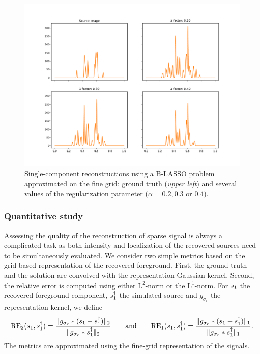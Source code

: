         \begin{figure}[t]
            \centering
            \includegraphics[width=\linewidth, trim=0 2cm 0 2.2cm, clip]{figures/simple_reco/blasso_merged.pdf}
            \caption{Single-component reconstructions using a B-LASSO problem approximated on the fine grid: ground truth (\textit{upper left}) and several values of the regularization parameter ($\alpha=0.2, 0.3$ or $0.4$). }
            \label{fig:simple:blasso-conv}
        \end{figure}
        
        \subsubsection{Quantitative study}

        Assessing the quality of the reconstruction of sparse signal is always a complicated task as both intensity and localization of the recovered sources need to be simultaneously evaluated. We consider two simple metrics based on the grid-based representation of the recovered foreground. First, the ground truth and the solution are convolved with the representation Gaussian kernel. Second, the relative error is computed using either $\mathrm{L}^2$-norm or the $\mathrm{L}^1$-norm. For $s_1$ the recovered foreground component, $s_1^\dagger$ the simulated source and $g_{\sigma_r}$ the representation kernel, we define
        $$
        \mathrm{RE}_2(s_1, s_1^\dagger) = \frac{\lVert g_{\sigma_r} * (s_1 - s_1^\dagger) \rVert_2 }{ \lVert g_{\sigma_r} * s_1^\dagger \rVert_2} \qquad\text{and}\qquad
        \mathrm{RE}_1(s_1, s_1^\dagger) = \frac{\lVert g_{\sigma_r} * (s_1 - s_1^\dagger) \rVert_1}{\lVert g_{\sigma_r} *s_1^\dagger \rVert_1}.
        $$
        The metrics are approximated using the fine-grid representation of the signals.

